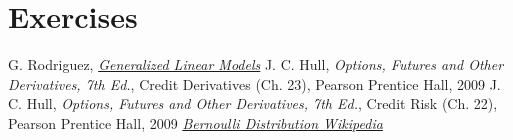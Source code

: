 \section*{Exercises}


\begin{thebibliography}{9}
 G. Rodriguez, \href{https://data.princeton.edu/wws509/notes/c7s1}{\emph{Generalized Linear Models}} 
 J. C. Hull, \emph{Options, Futures and Other Derivatives, 7th Ed.}, Credit Derivatives (Ch. 23), Pearson Prentice Hall, 2009
 J. C. Hull, \emph{Options, Futures and Other Derivatives, 7th Ed.}, Credit Risk (Ch. 22), Pearson Prentice Hall, 2009
\href{https://en.wikipedia.org/wiki/Bernoulli_distribution}{\emph{Bernoulli Distribution Wikipedia}}
\end{thebibliography}
